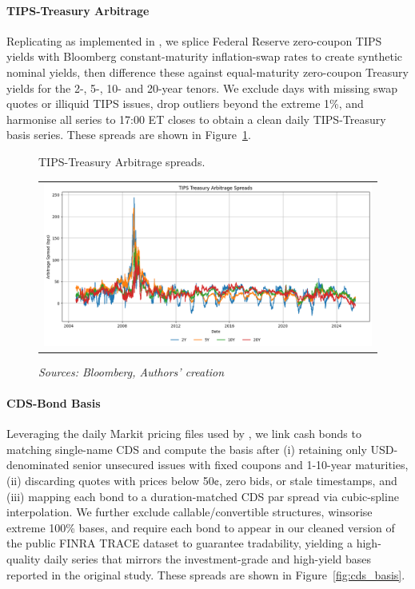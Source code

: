 \documentclass{article}
\begin{document}
\paragraph{TIPS-Treasury Arbitrage}
Replicating \citet{Fleckenstein2014} as implemented in \citet{Siriwardane2021}, we splice Federal Reserve zero-coupon TIPS yields with Bloomberg constant-maturity inflation-swap rates to create synthetic nominal yields, then difference these against equal-maturity zero-coupon Treasury yields for the 2-, 5-, 10- and 20-year tenors.  We exclude days with missing swap quotes or illiquid TIPS issues, drop outliers beyond the extreme 1\%, and harmonise all series to 17:00 ET closes to obtain a clean daily TIPS-Treasury basis series.
These spreads are shown in Figure~\ref{fig:tips_treasury_basis}.

\begin{figure}[h]
    \caption{TIPS-Treasury Arbitrage spreads.}
  \centering
  \begin{tabular}{@{}c@{}}
    \includegraphics[width=.95\linewidth]{../docs_src/tips_treasury_arbitrage_spreads.png}
  \end{tabular}
  \caption*{\emph{Sources: Bloomberg, Authors' creation}}
  \label{fig:tips_treasury_basis}
\end{figure}

\paragraph{CDS-Bond Basis}

Leveraging the daily Markit pricing files used by \citet{Siriwardane2021}, we link cash bonds to matching single-name CDS and compute the basis after (i) retaining only USD-denominated senior unsecured issues with fixed coupons and 1-10-year maturities, (ii) discarding quotes with prices below 50¢, zero bids, or stale timestamps, and (iii) mapping each bond to a duration-matched CDS par spread via cubic-spline interpolation.  We further exclude callable/convertible structures, winsorise extreme 100\% bases, and require each bond to appear in our cleaned version of the public FINRA TRACE dataset to guarantee tradability, yielding a high-quality daily series that mirrors the investment-grade and high-yield bases reported in the original study.
These spreads are shown in Figure~\ref{fig:cds_basis}.
\end{document}
